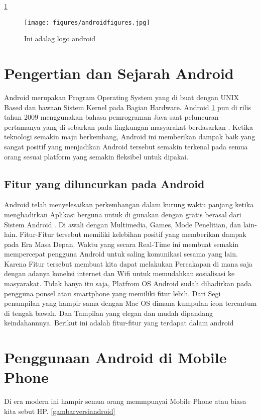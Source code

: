 
\ref{androidfigures}
\begin{figure}[ht]
\centerline{\texttt{[image: figures/androidfigures.jpg]}}
\caption{Ini adalag logo android}
\label{androidfigures}
\end{figure}
\section{Pengertian dan Sejarah Android}
	Android merupakan Program Operating System yang di buat dengan UNIX Based dan bawaan Sistem Kernel
	pada Bagian Hardware. Android \ref{androidfigures} pun di rilis tahun 2009 menggunakan bahasa pemrograman Java saat peluncuran pertamanya yang
	di sebarkan pada lingkungan masyarakat berdasarkan \cite{rasjid2015android}. Ketika teknologi semakin maju berkembang, Android ini memberikan dampak baik yang sangat positif
	yang menjadikan Android tersebut semakin terkenal pada semua orang sesuai platform yang semakin fleksibel untuk dipakai.
	
	\subsection{Fitur yang diluncurkan pada Android}
	Android telah menyelesaikan perkembangan dalam kurung waktu panjang ketika menghadirkan Aplikasi berguna untuk di gunakan dengan gratis berasal dari Sistem Android . Di awali
	dengan Multimedia, Games, Mode Penelitian, dan lain-lain. Fitur-Fitur tersebut memiliki kelebihan positif yang memberikan dampak pada Era Masa Depan.
	Waktu yang secara Real-Time ini membuat semakin mempercepat pengguna Android untuk saling komunikasi sesama yang lain. Karena Fitur tersebut
	membuat kita dapat melakukan Percakapan di mana saja dengan adanya koneksi internet dan Wifi untuk memudahkan sosialisasi ke masyarakat.
	Tidak hanya itu saja, Platfrom OS Android sudah dihadirkan pada pengguna ponsel atau smartphone yang memiliki fitur lebih.
	Dari Segi penampilan yang hampir sama dengan Mac OS dimana kumpulan icon tercantum di tengah bawah. Dan Tampilan yang elegan dan mudah
	dipandang keindahannnya. Berikut ini adalah fitur-fitur yang terdapat dalam android \cite{triadi2013bedah}


\section{Penggunaan Android di Mobile Phone}
Di era modern ini hampir semua orang memmpunyai Mobile Phone atau biasa kita sebut HP. \cite{triadi2013bedah}
	\ref{gambarversiandroid}
